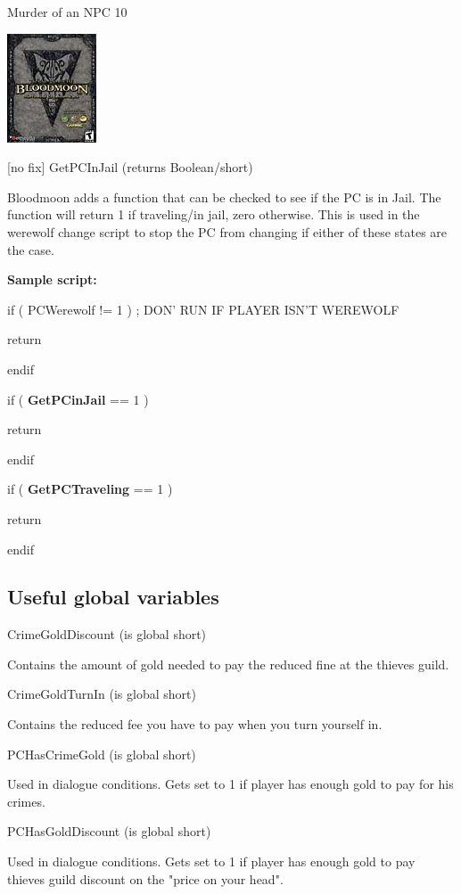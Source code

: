 \documentclass[
]{article}
\begin{document}
Murder of an NPC 10

\includegraphics{media/image7.png}

{[}no fix{]} GetPCInJail (returns Boolean/short)

Bloodmoon adds a function that can be checked to see if the PC is in
Jail. The function will return 1 if traveling/in jail, zero otherwise.
This is used in the werewolf change script to stop the PC from changing
if either of these states are the case.

\textbf{Sample script:}

if ( PCWerewolf != 1 ) ; DON' RUN IF PLAYER ISN'T WEREWOLF

return

endif

if ( \textbf{GetPCinJail} == 1 )

return

endif

if ( \textbf{GetPCTraveling} == 1 )

return

endif

\hypertarget{useful-global-variables}{%
\subsection{\texorpdfstring{\hfill\break
Useful global
variables}{ Useful global variables}}\label{useful-global-variables}}

CrimeGoldDiscount (is global short)

Contains the amount of gold needed to pay the reduced fine at the
thieves guild.

CrimeGoldTurnIn (is global short)

Contains the reduced fee you have to pay when you turn yourself in.

PCHasCrimeGold (is global short)

Used in dialogue conditions. Gets set to 1 if player has enough gold to
pay for his crimes.

PCHasGoldDiscount (is global short)

Used in dialogue conditions. Gets set to 1 if player has enough gold to
pay thieves guild discount on the "price on your head".
\end{document}
